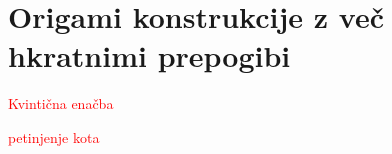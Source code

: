 \section{Origami konstrukcije z več hkratnimi prepogibi}

\textcolor{red}{Kvintična enačba}

\textcolor{red}{petinjenje kota}